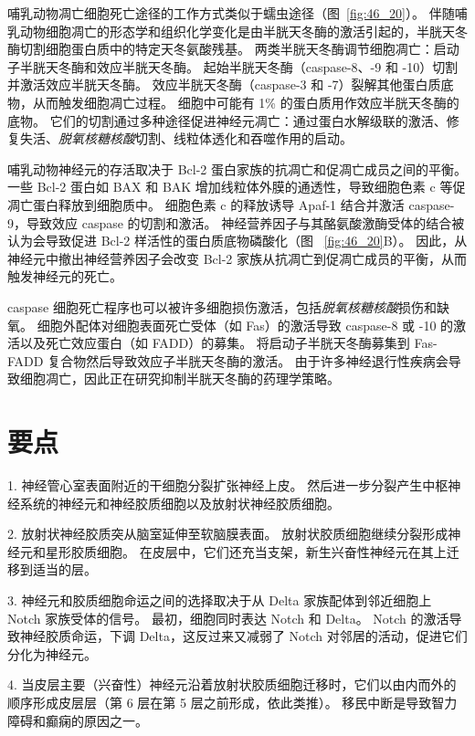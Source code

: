哺乳动物凋亡细胞死亡途径的工作方式类似于蠕虫途径（图~\ref{fig:46_20}）。
伴随哺乳动物细胞凋亡的形态学和组织化学变化是由半胱天冬酶的激活引起的，半胱天冬酶切割细胞蛋白质中的特定天冬氨酸残基。
两类半胱天冬酶调节细胞凋亡：启动子半胱天冬酶和效应半胱天冬酶。 起始半胱天冬酶（caspase-8、-9 和 -10）切割并激活效应半胱天冬酶。
效应半胱天冬酶（caspase-3 和 -7）裂解其他蛋白质底物，从而触发细胞凋亡过程。
细胞中可能有 1\% 的蛋白质用作效应半胱天冬酶的底物。
它们的切割通过多种途径促进神经元凋亡：通过蛋白水解级联的激活、修复失活、\textit{脱氧核糖核酸}切割、线粒体透化和吞噬作用的启动。


哺乳动物神经元的存活取决于 Bcl-2 蛋白家族的抗凋亡和促凋亡成员之间的平衡。
一些 Bcl-2 蛋白如 BAX 和 BAK 增加线粒体外膜的通透性，导致细胞色素 c 等促凋亡蛋白释放到细胞质中。
细胞色素 c 的释放诱导 Apaf-1 结合并激活 caspase-9，导致效应 caspase 的切割和激活。
神经营养因子与其酪氨酸激酶受体的结合被认为会导致促进 Bcl-2 样活性的蛋白质底物磷酸化（图 ~\ref{fig:46_20}B）。
因此，从神经元中撤出神经营养因子会改变 Bcl-2 家族从抗凋亡到促凋亡成员的平衡，从而触发神经元的死亡。


caspase 细胞死亡程序也可以被许多细胞损伤激活，包括\textit{脱氧核糖核酸}损伤和缺氧。
细胞外配体对细胞表面死亡受体（如 Fas）的激活导致 caspase-8 或 -10 的激活以及死亡效应蛋白（如 FADD）的募集。
将启动子半胱天冬酶募集到 Fas-FADD 复合物然后导致效应子半胱天冬酶的激活。
由于许多神经退行性疾病会导致细胞凋亡，因此正在研究抑制半胱天冬酶的药理学策略。



\section{要点}

1. 神经管心室表面附近的干细胞分裂扩张神经上皮。
然后进一步分裂产生中枢神经系统的神经元和神经胶质细胞以及放射状神经胶质细胞。


2. 放射状神经胶质突从脑室延伸至软脑膜表面。
放射状胶质细胞继续分裂形成神经元和星形胶质细胞。
在皮层中，它们还充当支架，新生兴奋性神经元在其上迁移到适当的层。


3. 神经元和胶质细胞命运之间的选择取决于从 Delta 家族配体到邻近细胞上 Notch 家族受体的信号。
最初，细胞同时表达 Notch 和 Delta。
Notch 的激活导致神经胶质命运，下调 Delta，这反过来又减弱了 Notch 对邻居的活动，促进它们分化为神经元。


4. 当皮层主要（兴奋性）神经元沿着放射状胶质细胞迁移时，它们以由内而外的顺序形成皮层层（第 6 层在第 5 层之前形成，依此类推）。
移民中断是导致智力障碍和癫痫的原因之一。


